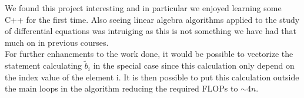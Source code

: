 \documentclass[12pt]{article}
\numberwithin{figure}{section}
\numberwithin{table}{section}
\begin{document}
\noindent We found this project interesting and in particular we enjoyed learning some C++ for the first time. Also seeing linear algebra algorithms applied to the study of differential equations was intruiging as this is not something we have had that much on in previous courses. \\

\noindent For further enhancments to the work done, it would be possible to vectorize the statement calculating $\tilde{b}_i$ in the special case since this calculation only depend on the index value of the element i. It is then possible to put this calculation outside the main loops in the algorithm reducing the required FLOPs to $\sim 4n$.   


{}

\end{document}
